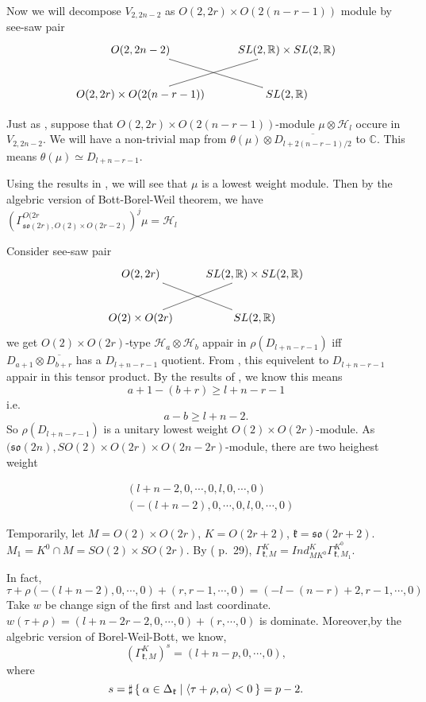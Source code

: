 \documentclass[12pt]{article}
\def\bR{{\mathbb{R}}}
\def\bC{{\mathbb{C}}}
\def\inn#1#2{\left\langle{#1},{#2}\right\rangle}
\def\aso{\mathfrak{so}}
\def\fkk{\mathfrak{k}}
\def\chh{\mathcal{H}}
\begin{document}
Now we will decompose $V_{2,2n-2}$ as $O(2,2r)\times O(2(n-r-1))$ module
 by see-saw pair
\[
\xymatrix{
O(2,2n-2) \ar@{-}[dr]& SL(2,\bR)\times SL(2,\bR) \\
O(2,2r)\times O(2(n-r-1))\ar@{-}[ur] & SL(2,\bR)}
\]

Just as \cite{ZhuHuang1997}, suppose that $O(2,2r)\times O(2(n-r-1))$-module 
$\mu \otimes \chh_l$ occure in $V_{2,2n-2}$.
We will have a non-trivial map from 
$\theta(\mu)\otimes \overline{D_{l+2(n-r-1)/2}}$ to $\bC$. 
This means $\theta(\mu)\simeq D_{l+n-r-1}$. 

Using the results in \cite{Howe1979Opq}, we will see that $\mu$ is a lowest 
weight module. Then by the algebric version of Bott-Borel-Weil theorem, 
we have $(\Gamma_{\aso(2r),O(2)\times O(2r-2)}^{O(2r})^j \mu = \chh_l$

Consider see-saw pair 
\[
\xymatrix{
O(2,2r) \ar@{-}[dr]& SL(2,\bR)\times SL(2,\bR) \\
O(2)\times O(2r)\ar@{-}[ur] & SL(2,\bR)}
\] 
we get $O(2)\times O(2r)$-type
 $\chh_a\otimes \chh_b$ appair in $\rho(D_{l+n-r-1})$ 
iff $D_{a+1}\otimes \overline{D_{b+r}}$ has a $D_{l+n-r-1}$ quotient.
From \cite{Howe1979Opq},
this equivelent to $D_{l+n-r-1}$ appair in this tensor product. 
By the results of \cite{Repka1976tensor}, we know this means
\[
a+1 - (b+r)\geq l + n-r-1
\]
i.e. 
\[
a -b \geq l+n-2.
\]
So $\rho(D_{l+n-r-1})$ is a unitary lowest weight $O(2)\times O(2r)$-module.
As $(\aso(2n), SO(2)\times O(2r)\times O(2n-2r)$-module, there are two heighest
weight

\begin{align*}
&(l+n-2, 0,\cdots, 0, l, 0, \cdots,0)\\
&(-(l+n-2), 0, \cdots, 0,l , 0, \cdots, 0)
\end{align*}

Temporarily, let $M = O(2)\times O(2r)$, $K = O(2r+2)$, $\fkk = \aso(2r+2)$. 
$M_1 = K^0\cap M = SO(2)\times SO(2r)$.
By (\cite{BorelWallach2000} p.~29), 
$\Gamma_{\fkk,M}^{K} = Ind_{MK^0}^K\Gamma_{\fkk,M_1}^{K^0}$.


In fact, 
\[
\tau+\rho(-(l+n-2),0,\cdots, 0) + (r,r-1, \cdots, 0)
= (-l-(n-r)+2,r-1, \cdots, 0)
\]
Take $w$ be change sign of the first and last coordinate. 
$w(\tau+\rho)= (l+n-2r-2, 0, \cdots, 0) + (r,\cdots, 0)$ is dominate.
Moreover,by the algebric version of Borel-Weil-Bott, we know, 
\[
(\Gamma_{\fkk,M}^K)^s = (l+n-p,0, \cdots, 0),
\]
where 
\[
s = \sharp\Set{\alpha\in \Delta_\fkk|\inn{\tau+\rho}{\alpha}<0}
= p-2.
\]
\end{document}
